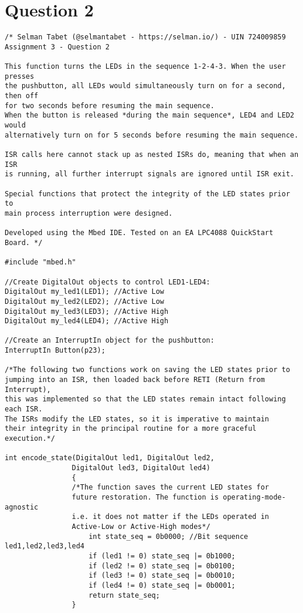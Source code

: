 \documentclass{article}
\begin{document}
\section*{Question 2}
\begin{verbatim}
/* Selman Tabet (@selmantabet - https://selman.io/) - UIN 724009859
Assignment 3 - Question 2

This function turns the LEDs in the sequence 1-2-4-3. When the user presses
the pushbutton, all LEDs would simultaneously turn on for a second, then off
for two seconds before resuming the main sequence. 
When the button is released *during the main sequence*, LED4 and LED2 would
alternatively turn on for 5 seconds before resuming the main sequence.

ISR calls here cannot stack up as nested ISRs do, meaning that when an ISR
is running, all further interrupt signals are ignored until ISR exit.

Special functions that protect the integrity of the LED states prior to
main process interruption were designed.

Developed using the Mbed IDE. Tested on an EA LPC4088 QuickStart Board. */

#include "mbed.h"

//Create DigitalOut objects to control LED1-LED4:
DigitalOut my_led1(LED1); //Active Low
DigitalOut my_led2(LED2); //Active Low
DigitalOut my_led3(LED3); //Active High
DigitalOut my_led4(LED4); //Active High

//Create an InterruptIn object for the pushbutton:
InterruptIn Button(p23);

/*The following two functions work on saving the LED states prior to 
jumping into an ISR, then loaded back before RETI (Return from Interrupt),
this was implemented so that the LED states remain intact following each ISR.
The ISRs modify the LED states, so it is imperative to maintain
their integrity in the principal routine for a more graceful execution.*/

int encode_state(DigitalOut led1, DigitalOut led2, 
                DigitalOut led3, DigitalOut led4)
                {
                /*The function saves the current LED states for 
                future restoration. The function is operating-mode-agnostic
                i.e. it does not matter if the LEDs operated in
                Active-Low or Active-High modes*/
                    int state_seq = 0b0000; //Bit sequence led1,led2,led3,led4
                    if (led1 != 0) state_seq |= 0b1000;
                    if (led2 != 0) state_seq |= 0b0100;
                    if (led3 != 0) state_seq |= 0b0010;
                    if (led4 != 0) state_seq |= 0b0001;
                    return state_seq;
                }
                

\end{verbatim}
\end{document}

